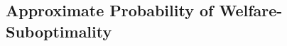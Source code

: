 \documentclass[letterpaper]{article} %
\newtheorem{theorem}{Theorem}
\DeclareMathOperator*{\poly}{poly}
\begin{document}




\subsection{Approximate Probability of Welfare-Suboptimality}
\label{sec:Probability of Welfare-Suboptimality}
%
\end{document}
